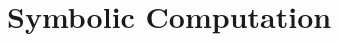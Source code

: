 \documentclass[../computational_physics.tex]{subfiles}
\begin{document}
    \section{Symbolic Computation}


    
\end{document}
